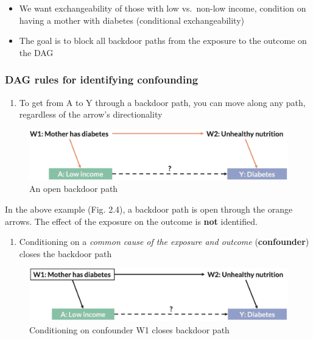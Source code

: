 \documentclass[
]{book}
\providecommand{\tightlist}{%
  \setlength{\itemsep}{0pt}\setlength{\parskip}{0pt}}
\begin{document}
\begin{itemize}
\tightlist
\item
  We want exchangeability of those with low vs.~non-low income, condition on having a mother with diabetes (conditional exchangeability)
\item
  The goal is to block all backdoor paths from the exposure to the outcome on the DAG
\end{itemize}

\hypertarget{dag-rules-for-identifying-confounding}{%
\subsubsection{DAG rules for identifying confounding}\label{dag-rules-for-identifying-confounding}}

\begin{enumerate}
\def\labelenumi{\arabic{enumi}.}
\tightlist
\item
  To get from A to Y through a backdoor path, you can move along any path, regardless of the arrow's directionality
\end{enumerate}

\begin{figure}

{\centering \includegraphics[width=1\linewidth]{img/confounding/dag_rules_1} 

}

\caption{An open backdoor path}\label{fig:unnamed-chunk-15}
\end{figure}

In the above example (Fig. 2.4), a backdoor path is open through the orange arrows. The effect of the exposure on the outcome is \textbf{not} identified.

\begin{enumerate}
\def\labelenumi{\arabic{enumi}.}
\setcounter{enumi}{1}
\tightlist
\item
  Conditioning on a \emph{common cause of the exposure and outcome} (\textbf{confounder}) closes the backdoor path
\end{enumerate}

\begin{figure}

{\centering \includegraphics[width=1\linewidth]{img/confounding/dag_rules_2} 

}

\caption{Conditioning on confounder W1 closes backdoor path}\label{fig:unnamed-chunk-16}
\end{figure}
\end{document}
